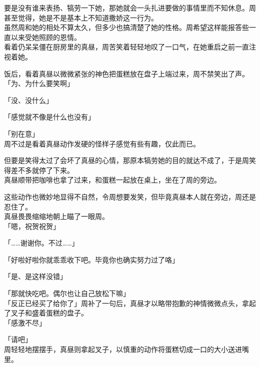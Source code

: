 要是没有谁来表扬、犒劳一下她，那她就会一头扎进要做的事情里而不知休息。周甚至觉得，她是不是基本上不知道撒娇这一行为。\\

虽然周和她的相处不算太久，但多少也搞清楚了她的性格。周希望这样能报答些一直以来受她照顾的恩情。\\

看着仍呆呆僵在厨房里的真昼，周苦笑着轻轻地叹了一口气，在她重启之前一直注视着她。\\

\vspace{2\baselineskip}

饭后，看着真昼以微微紧张的神色把蛋糕放在盘子上端过来，周不禁笑出了声。\\

「为、为什么要笑啊」

「没、没什么」

「感觉就不像是什么也没有」

「别在意」\\

周不过是看着真昼动作发硬的怪样子感觉有些有趣，仅此而已。

但要是笑得太过了会坏了真昼的心情，那原本犒劳她的目的就达不成了，于是周笑得差不多就停了下来。\\

真昼顺带把咖啡也拿了过来，和蛋糕一起放在桌上，坐在了周的旁边。

这些动作也微妙地显得不自然，令周想要发笑，但毕竟真昼本人就在旁边，周还是忍住了。\\

真昼畏畏缩缩地朝上瞄了一眼周。\\

「嗯，祝贺祝贺」

「……谢谢你。不过……」

「好啦好啦你就乖乖收下吧。毕竟你也确实努力过了咯」

「是、是这样没错」

「那就快吃吧。偶尔也让自己放松下嘛」\\

「反正已经买了给你了」周补了一句后，真昼才以略带抱歉的神情微微点头，拿起了叉子和盛着蛋糕的盘子。\\

「感激不尽」

「请吧」\\

周轻轻地摆摆手，真昼则拿起叉子，以慎重的动作将蛋糕切成一口的大小送进嘴里。\\


